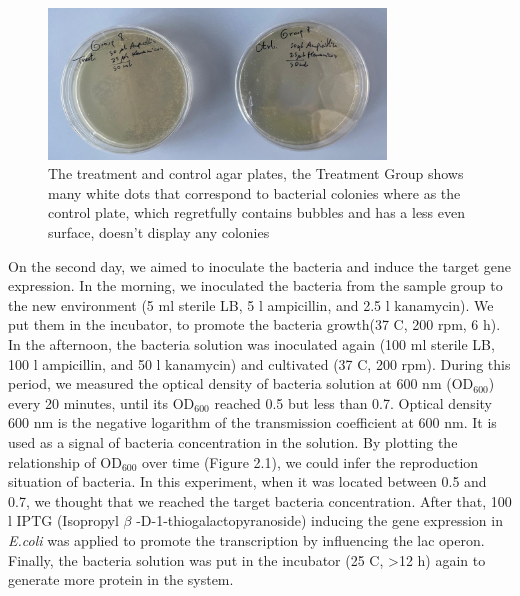 \documentclass[a4paper,english,12pt,bibliography=totoc]{scrreprt}
\begin{document}
\begin{figure}[H]
    \centering
    \includegraphics[width = 0.8\textwidth]{Figures/agarplates.jpeg}
    \caption{The treatment and control agar plates,
    the Treatment Group shows many  white dots that correspond to bacterial colonies where as the control plate, which  regretfully contains bubbles and has a less even surface, doesn't display any colonies}
    \label{fig:enter-label}
\end{figure}



On the second day, we aimed to inoculate the bacteria and induce the target gene expression. In the morning, we inoculated the bacteria from the sample group to the new environment (5 ml sterile LB, 5 \textmu l ampicillin, and 2.5 \textmu l kanamycin). We put them in the incubator, to promote the bacteria growth(37 \textdegree C, 200 rpm, 6 h). In the afternoon, the bacteria solution was inoculated again (100 ml sterile LB, 100 \textmu l ampicillin, and 50 \textmu l kanamycin) and cultivated (37 \textdegree C, 200 rpm). During this period, we measured the optical density of bacteria solution at 600 nm ($\mathrm{OD_{600}}$) every 20 minutes, until its $\mathrm{OD_{600}}$ reached 0.5 but less than 0.7. Optical density 600 nm is the negative logarithm of the transmission coefficient at 600 nm. It is used as a signal of bacteria concentration in the solution. By plotting the relationship of $\mathrm{OD_{600}}$ over time (Figure 2.1), we could infer the reproduction situation of bacteria. In this experiment, when it was located between 0.5 and 0.7, we thought that we reached the target bacteria concentration. After that, 100  \textmu l IPTG (Isopropyl $\beta$ -D-1-thiogalactopyranoside) inducing the gene expression in \textit{E.coli} was applied to promote the transcription by influencing the lac operon. Finally, the bacteria solution was put in the incubator (25 \textdegree C, >12 h) again to generate more protein in the system.\\
\end{document}
